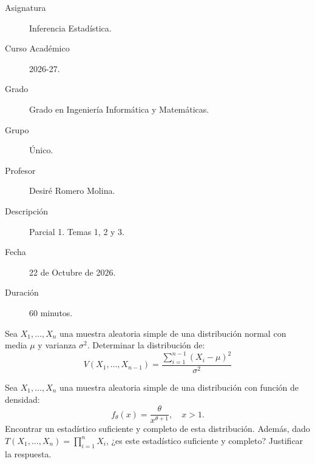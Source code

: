 \documentclass[12pt]{article}
\begin{document}

    
    

    \begin{description}
        \item[Asignatura] Inferencia Estadística.
        \item[Curso Académico] 2026-27.
        \item[Grado] Grado en Ingeniería Informática y Matemáticas.
        \item[Grupo] Único.
        \item[Profesor] Desiré Romero Molina.
        \item[Descripción] Parcial 1. Temas 1, 2 y 3.
        \item[Fecha] 22 de Octubre de 2026.  
        \item[Duración] 60 minutos.
    
    \end{description}
    \newpage


    
    \begin{ejercicio}
        Sea $X_1, \dots, X_n$ una muestra aleatoria simple de una distribución normal con media $\mu$ y varianza $\sigma^2$. Determinar la distribución de:
        \[
            V(X_1, \dots, X_{n-1}) = \frac{\sum\limits_{i=1}^{n-1} (X_i - \mu)^2}{\sigma^2}
        \]
    \end{ejercicio}

    \begin{ejercicio}
        Sea $X_1, \dots, X_n$ una muestra aleatoria simple de una distribución con función de densidad:
        \[
            f_\theta(x) = \frac{\theta}{x^{\theta + 1}}, \quad x > 1.
        \]
        Encontrar un estadístico suficiente y completo de esta distribución. Además, dado $T(X_1, \dots, X_n) = \prod\limits_{i=1}^n X_i$, ¿es este estadístico suficiente y completo? Justificar la respuesta.
    \end{ejercicio}
\end{document}
